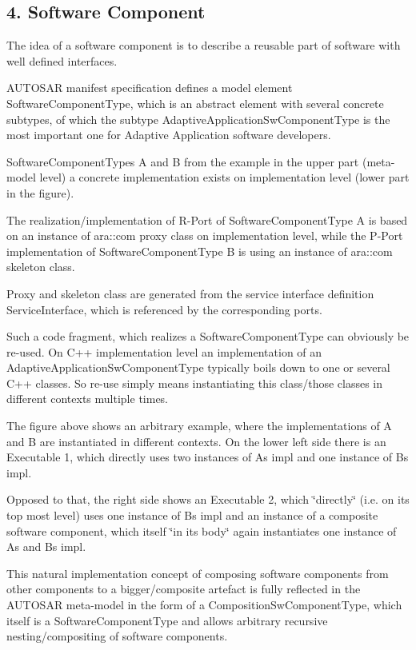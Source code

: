 \subsection*{4. Software Component}


\begin{DoxyItemize}
\item The idea of a software component is to describe a reusable part of software with well defined interfaces.
\item A\+U\+T\+O\+S\+AR manifest specification defines a model element Software\+Component\+Type, which is an abstract element with several concrete subtypes, of which the subtype Adaptive\+Application\+Sw\+Component\+Type is the most important one for Adaptive Application software developers. 
\item Software\+Component\+Types A and B from the example in the upper part (meta-\/model level) a concrete implementation exists on implementation level (lower part in the figure).
\item The realization/implementation of R-\/\+Port of Software\+Component\+Type A is based on an instance of ara\+::com proxy class on implementation level, while the P-\/\+Port implementation of Software\+Component\+Type B is using an instance of ara\+::com skeleton class.
\item Proxy and skeleton class are generated from the service interface definition Service\+Interface, which is referenced by the corresponding ports.
\item Such a code fragment, which realizes a Software\+Component\+Type can obviously be re-\/used. On C++ implementation level an implementation of an Adaptive\+Application\+Sw\+Component\+Type typically boils down to one or several C++ classes. So re-\/use simply means instantiating this class/those classes in different contexts multiple times. 
\item The figure above shows an arbitrary example, where the implementations of A and B are instantiated in different contexts. On the lower left side there is an Executable 1, which directly uses two instances of As impl and one instance of Bs impl.
\item Opposed to that, the right side shows an Executable 2, which \char`\"{}directly\char`\"{} (i.\+e. on its top most level) uses one instance of Bs impl and an instance of a composite software component, which itself \char`\"{}in its body\char`\"{} again instantiates one instance of As and Bs impl.
\item This natural implementation concept of composing software components from other components to a bigger/composite artefact is fully reflected in the A\+U\+T\+O\+S\+AR meta-\/model in the form of a Composition\+Sw\+Component\+Type, which itself is a Software\+Component\+Type and allows arbitrary recursive nesting/compositing of software components.
\end{DoxyItemize}

